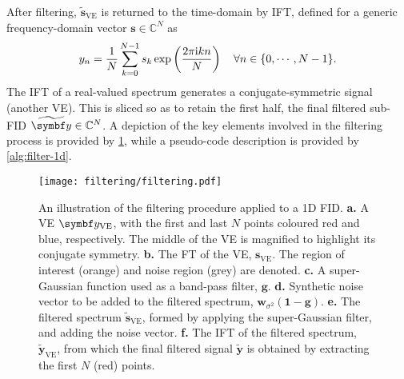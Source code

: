 After filtering, $\widetilde{\symbf{s}}_{\text{VE}}$ is returned to the
time-domain by \ac{IFT}, defined for a generic frequency-domain vector $\symbf{s} \in \mathbb{C}^N$ as
\begin{equation}
    y_n = \frac{1}{N} \sum_{k=0}^{N-1} s_k
        \exp\left(\frac{2 \pi \mathrm{i} k n}{N}\right)
        \quad \forall n \in \lbrace 0, \cdots, N-1 \rbrace.
\end{equation}
The \ac{IFT} of a real-valued spectrum generates a
conjugate-symmetric signal (another \ac{VE}). This is sliced so as to
retain the first half, the final filtered sub-FID $\widetilde{\by} \in
\mathbb{C}^{N}$.
A depiction of the key elements involved in the filtering process is provided
by \cref{fig:filtering}, while a pseudo-code description is provided by
\cref{alg:filter-1d}.
\begin{figure}
     \centering
     \texttt{[image: filtering/filtering.pdf]}
     \caption[
         An illustration of the filtering procedure applied to a \acs{1D}
         \acs{FID}.
     ]{
         An illustration of the filtering procedure applied to a \ac{1D}
         \ac{FID}.
         \textbf{a.} A \ac{VE} $\by_{\text{VE}}$, with the first and last
         $N$ points coloured red and blue, respectively. The middle of the
         \ac{VE} is magnified to highlight its conjugate symmetry.
         \textbf{b.} The \ac{FT} of the \ac{VE}, $\symbf{s}_{\text{VE}}$.
         The region of interest (orange) and noise region (grey) are denoted.
         \textbf{c.} A super-Gaussian function used as a band-pass filter,
         $\symbf{g}$.
         \textbf{d.} Synthetic noise vector to be added to the filtered
         spectrum, $\symbf{w}_{\sigma^2} (\symbf{1} - \symbf{g})$.
         \textbf{e.} The filtered spectrum $\widetilde{\symbf{s}}_{\text{VE}}$,
         formed by applying the super-Gaussian filter, and adding the noise
         vector.
         \textbf{f.} The \ac{IFT} of the filtered spectrum,
         $\widetilde{\symbf{y}}_{\text{VE}}$, from which the final filtered
         signal $\widetilde{\symbf{y}}$ is obtained by extracting
         the first $N$ (red) points.
     }
     \label{fig:filtering}
\end{figure}

